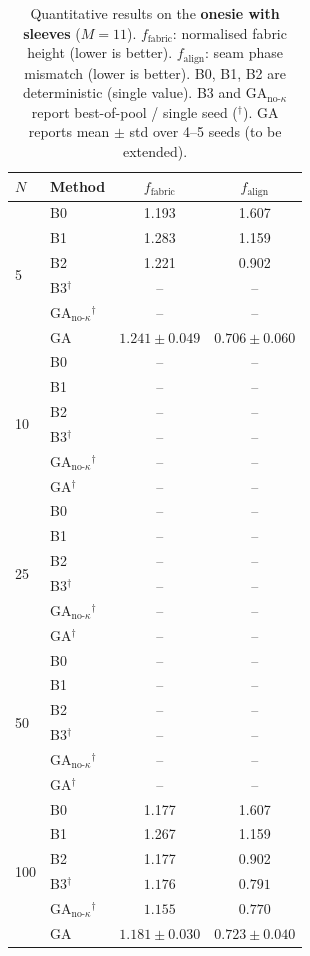 \begin{table}[t]
\centering
\caption{
  Quantitative results on the \textbf{onesie with sleeves} ($M=11$).
  $f_\text{fabric}$: normalised fabric height (lower is better).
  $f_\text{align}$: seam phase mismatch (lower is better).
  B0, B1, B2 are deterministic (single value).
  B3 and $\text{GA}_{\text{no-}\kappa}$ report best-of-pool / single
  seed ($^\dagger$).
  GA reports mean $\pm$ std over 4--5 seeds (to be extended).
}
\label{tab:results_onesie}
\setlength{\tabcolsep}{5pt}
\begin{tabular}{llcc}
\toprule
$N$ & Method & $f_\text{fabric}$ & $f_\text{align}$ \\
\midrule
\multirow{6}{*}{5}
  & B0 & 1.193 & 1.607 \\
  & B1 & 1.283 & 1.159 \\
  & B2 & 1.221 & 0.902 \\
  & B3$^\dagger$ & -- & -- \\
  & $\text{GA}_{\text{no-}\kappa}{}^\dagger$ & -- & -- \\
  & GA & $1.241 \pm 0.049$ & $\mathbf{0.706} \pm 0.060$ \\
\midrule
\multirow{6}{*}{10}
  & B0 & -- & -- \\
  & B1 & -- & -- \\
  & B2 & -- & -- \\
  & B3$^\dagger$ & -- & -- \\
  & $\text{GA}_{\text{no-}\kappa}{}^\dagger$ & -- & -- \\
  & GA$^\dagger$ & -- & -- \\
\midrule
\multirow{6}{*}{25}
  & B0 & -- & -- \\
  & B1 & -- & -- \\
  & B2 & -- & -- \\
  & B3$^\dagger$ & -- & -- \\
  & $\text{GA}_{\text{no-}\kappa}{}^\dagger$ & -- & -- \\
  & GA$^\dagger$ & -- & -- \\
\midrule
\multirow{6}{*}{50}
  & B0 & -- & -- \\
  & B1 & -- & -- \\
  & B2 & -- & -- \\
  & B3$^\dagger$ & -- & -- \\
  & $\text{GA}_{\text{no-}\kappa}{}^\dagger$ & -- & -- \\
  & GA$^\dagger$ & -- & -- \\
\midrule
\multirow{6}{*}{100}
  & B0 & 1.177 & 1.607 \\
  & B1 & 1.267 & 1.159 \\
  & B2 & 1.177 & 0.902 \\
  & B3$^\dagger$ & $1.176$ & $0.791$ \\
  & $\text{GA}_{\text{no-}\kappa}{}^\dagger$ & $1.155$ & $0.770$ \\
  & GA & $1.181 \pm 0.030$ & $\mathbf{0.723} \pm 0.040$ \\
\bottomrule
\end{tabular}
\end{table}

